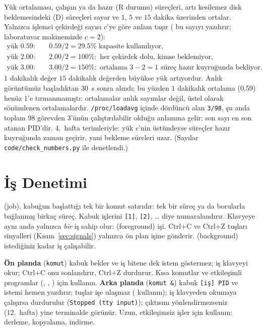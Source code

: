 \begin{example}
Yük ortalaması, çalışan ya da hazır (R durumu) süreçleri, artı kesilemez disk beklemesindeki (D) süreçleri sayar ve $1$, $5$ ve $15$ dakika üzerinden ortalar. Yalnızca işlemci çekirdeği sayısı $c$'ye göre anlam taşır ( bu sayıyı yazdırır; laboratuvar makinemizde $c = 2$):
\begin{align*}
\text{yük } 0.59: &\quad 0.59 / 2 = 29.5\% \text{ kapasite kullanılıyor,}\\
\text{yük } 2.00: &\quad 2.00 / 2 = 100\%: \text{ her çekirdek dolu, kimse beklemiyor,}\\
\text{yük } 3.00: &\quad 3.00 / 2 = 150\%: \text{ ortalama } 3 - 2 = 1 \text{ süreç hazır kuyruğunda bekliyor.}
\end{align*}
$1$ dakikalık değer $15$ dakikalık değerden büyükse yük artıyordur. Anlık görüntümüz  başladıktan $30$~s sonra alındı; bu yüzden $1$ dakikalık ortalama (0,59) henüz $1$'e tırmanmamıştı: ortalamalar anlık sayımlar değil, üstel olarak sönümlenen ortalamalardır. \texttt{/proc/loadavg} içinde dördüncü alan \texttt{3/98}, şu anda toplam $98$ görevden $3$'ünün çalıştırılabilir olduğu anlamına gelir; son sayı en son atanan PID'dir. 4.~hafta terimleriyle: yük $c$'nin üstündeyse süreçler hazır kuyruğunda zaman geçirir, yani bekleme süreleri uzar. (Sayılar \texttt{code/check\_numbers.py} ile denetlendi.)
\end{example}

\section{İş Denetimi}
\label{sec:jobs}

 (job), kabuğun başlattığı tek bir komut satırıdır: tek bir süreç ya da borularla bağlanmış birkaç süreç. Kabuk işlerini \texttt{[1]}, \texttt{[2]}, \dots{} diye numaralandırır. Klavyeye aynı anda yalnızca \emph{bir} iş sahip olur:  (foreground) işi. Ctrl+C ve Ctrl+Z tuşları sinyalleri (Kısım~\ref{sec:signals}) yalnızca ön plan işine gönderir.  (background) istediğiniz kadar iş çalışabilir.

\textbf{Ön planda} (\texttt{komut}) kabuk bekler ve iş bitene dek istem göstermez; iş klavyeyi okur; Ctrl+C onu sonlandırır, Ctrl+Z durdurur. Kısa komutlar ve etkileşimli programlar (, , ) için kullanın. \textbf{Arka planda} (\texttt{komut \&}) kabuk \texttt{[iş] PID} ve istemi hemen yazdırır; tuşlar işe ulaşmaz ( kullanın); iş klavyeden okumaya çalışırsa durdurulur (\texttt{Stopped (tty input)}); çıktısını yönlendirmezseniz (12.~hafta) yine terminalde görünür. Uzun, etkileşimsiz işler için kullanın: derleme, kopyalama, indirme.

